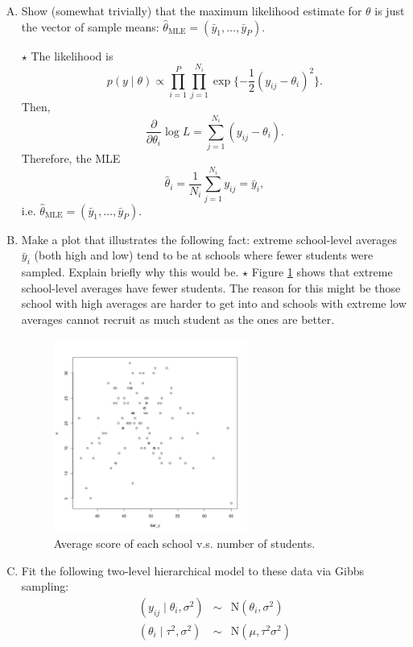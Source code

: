 \documentclass[11pt]{article}
\newcommand{\jie}{$\star$ }
\begin{document}
\begin{enumerate}[(A)]
\item Show (somewhat trivially) that the maximum likelihood estimate for $\theta$ is just the vector of sample means: $\hat{\theta}_{\mathrm{MLE}} = (\bar{y}_1, \ldots, \bar{y}_P)$.  

\bigskip
\jie
The likelihood is
$$p(y \mid \theta) \propto \prod_{i=1}^P \prod_{j=1}^{N_i} \exp\{-\frac{1}{2} (y_{ij} - \theta_i)^2\}.$$
Then,
$$\frac{\partial}{\partial \theta_i} \log L = \sum_{j=1}^{N_i} (y_{ij} - \theta_i).$$
Therefore, the MLE 
$$\hat{\theta}_i = \frac{1}{N_i} \sum_{j=1}^{N_i} y_{ij} = \bar{y}_i,$$
i.e. $\hat{\theta}_{\mathrm{MLE}} = (\bar{y}_1, \ldots, \bar{y}_P)$.
\bigskip

\item Make a plot that illustrates the following fact: extreme school-level averages $\bar{y}_i$ (both high and low) tend to be at schools where fewer students were sampled.  Explain briefly why this would be.
\bigskip
\jie
Figure \ref{fig:bary_n} shows that extreme school-level averages have fewer students. The reason for this might be those school with high averages are harder to get into and schools with extreme low averages cannot recruit as much student as the ones are better.
\begin{figure}[h]
    \centering
    \includegraphics[width=0.6\textwidth]{Ex4/figures/bary_n.jpeg}
    \caption{Average score of each school v.s. number of students.}
    \label{fig:bary_n}
\end{figure}

\item Fit the following two-level hierarchical model to these data via Gibbs sampling:
\begin{eqnarray*}
(y_{ij} \mid \theta_i, \sigma^2) &\sim& \mbox{N}(\theta_i, \sigma^2) \\
(\theta_i \mid \tau^2, \sigma^2) &\sim& \mbox{N}(\mu, \tau^2 \sigma^2)
\end{eqnarray*}


\end{enumerate}
\end{document}
